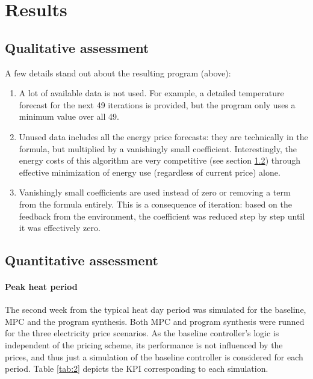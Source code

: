 \newpage
\section{Results}
\label{sec:boptest-results}

\subsection{Qualitative assessment}



A few details stand out about the resulting program (above):
\begin{enumerate}
    \item A lot of available data is not used. For example, a detailed temperature forecast for the next 49 iterations is provided, but the program only uses a minimum value over all 49.
    \item Unused data includes all the energy price forecasts: they are technically in the formula, but multiplied by a vanishingly small coefficient. Interestingly, the energy costs of this algorithm are very competitive (see section \ref{sec:boptest-results-quantitative}) through effective minimization of energy use (regardless of current price) alone.
    \item Vanishingly small coefficients are used instead of zero or removing a term from the formula entirely. This is a consequence of iteration: based on the feedback from the environment, the coefficient was reduced step by step until it was effectively zero.
\end{enumerate}

\newpage
\subsection{Quantitative assessment}
\label{sec:boptest-results-quantitative}

\paragraph{Peak heat period}
The second week from the typical heat day period was simulated for the baseline, MPC and the program synthesis. Both MPC and program synthesis were runned for the three electricity price scenarios. As the baseline controller's logic is independent of the pricing scheme, its performance is not influenced by the prices, and thus just a simulation of the baseline controller is considered for each period. Table \ref{tab:2} depicts the KPI corresponding to each simulation.

